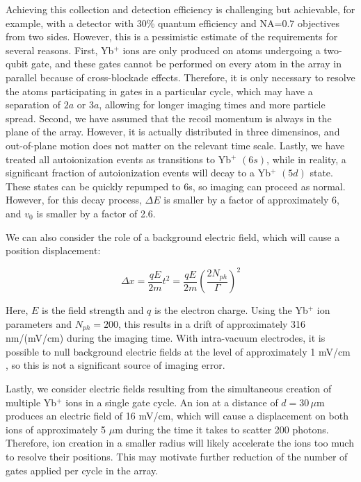 \documentclass[%
reprint,
superscriptaddress,
 amsmath,amssymb,
 aps,
 prx,
floatfix,
]{revtex4-1}
\begin{document}
Achieving this collection and detection efficiency is challenging but achievable, for example, with a detector with 30\% quantum efficiency and NA=0.7 objectives from two sides. However, this is a pessimistic estimate of the requirements for several reasons. First, Yb$^+$ ions are only produced on atoms undergoing a two-qubit gate, and these gates cannot be performed on every atom in the array in parallel because of cross-blockade effects. Therefore, it is only necessary to resolve the atoms participating in gates in a particular cycle, which may have a separation of $2a$ or $3a$, allowing for longer imaging times and more particle spread. Second, we have assumed that the recoil momentum is always in the plane of the array. However, it is actually distributed in three dimensinos, and out-of-plane motion does not matter on the relevant time scale. Lastly, we have treated all autoionization events as transitions to Yb$^+$ $(6s)$, while in reality, a significant fraction of autoionization events will decay to a Yb$^+$ $(5d)$ state. These states can be quickly repumped to 6s, so imaging can proceed as normal. However, for this decay process, $\Delta E$ is smaller by a factor of approximately 6, and $v_0$ is smaller by a factor of 2.6.

We can also consider the role of a background electric field, which will cause a position displacement:

\begin{equation}
\Delta x = \frac{q E}{2 m} t^2 = \frac{q E}{2 m} \left(\frac{2 N_{ph}}{\Gamma}\right)^2
\end{equation}

Here, $E$ is the field strength and $q$ is the electron charge. Using the Yb$^{+}$ ion parameters and $N_{ph} = 200$, this results in a drift of approximately 316 nm/(mV/cm) during the imaging time. With intra-vacuum electrodes, it is possible to null background electric fields at the level of approximately 1 mV/cm \cite{Wilson2019}, so this is not a significant source of imaging error.

Lastly, we consider electric fields resulting from the simultaneous creation of multiple Yb$^{+}$ ions in a single gate cycle. An ion at a distance of $d=30\,\mu$m produces an electric field of 16 mV/cm, which will cause a displacement on both ions of approximately 5 $\mu$m during the time it takes to scatter 200 photons. Therefore, ion creation in a smaller radius will likely accelerate the ions too much to resolve their positions. This may motivate further reduction of the number of gates applied per cycle in the array.
\end{document}
